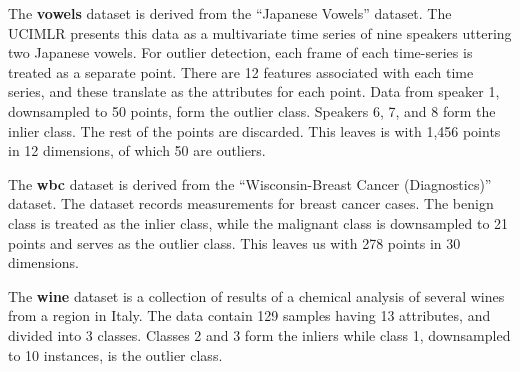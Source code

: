 The \textbf{vowels} dataset is derived from the ``Japanese Vowels'' dataset.
The UCIMLR presents this data as a multivariate time series of nine speakers uttering two Japanese vowels.
For outlier detection, each frame of each time-series is treated as a separate point.
There are 12 features associated with each time series, and these translate as the attributes for each point.
Data from speaker 1, downsampled to 50 points, form the outlier class.
Speakers 6, 7, and 8 form the inlier class.
The rest of the points are discarded.
This leaves is with 1,456 points in 12 dimensions, of which 50 are outliers.

The \textbf{wbc} dataset is derived from the ``Wisconsin-Breast Cancer (Diagnostics)'' dataset.
The dataset records measurements for breast cancer cases.
The benign class is treated as the inlier class, while the malignant class is downsampled to 21 points and serves as the outlier class.
This leaves us with 278 points in 30 dimensions.

The \textbf{wine} dataset is a collection of results of a chemical analysis of several wines from a region in Italy.
The data contain 129 samples having 13 attributes, and divided into 3 classes.
Classes 2 and 3 form the inliers while class 1, downsampled to 10 instances, is the outlier class.


